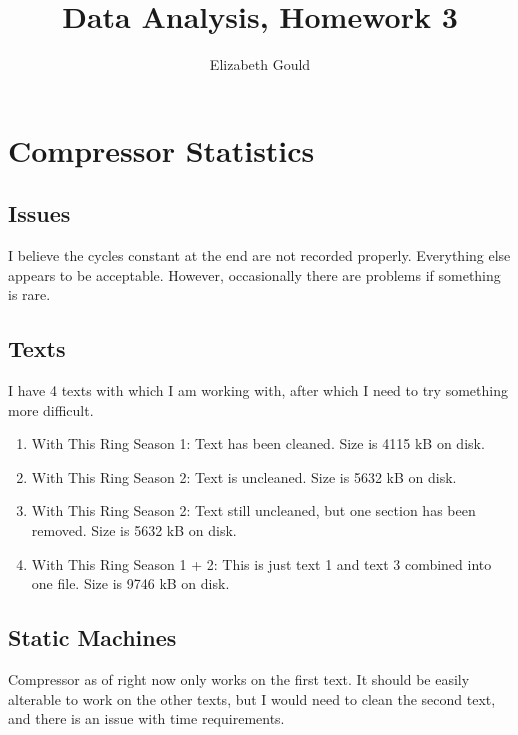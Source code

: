 \documentclass{article}
\title{Data Analysis, Homework 3}
\author{Elizabeth Gould}
\begin{document}
\maketitle

\section{Compressor Statistics}

\subsection{Issues}

I believe the cycles constant at the end are not recorded properly. Everything else appears to be acceptable. However, occasionally there are problems if something is rare.

\subsection{Texts}

I have 4 texts with which I am working with, after which I need to try something more difficult. 

\begin{enumerate}
\item With This Ring Season 1: Text has been cleaned. Size is 4115 kB on disk. 
\item With This Ring Season 2: Text is uncleaned. Size is 5632 kB on disk.
\item With This Ring Season 2: Text still uncleaned, but one section has been removed. Size is 5632 kB on disk.
\item With This Ring Season 1 + 2: This is just text 1 and text 3 combined into one file. Size is 9746 kB on disk.

\end{enumerate}

\subsection{Static Machines}

Compressor as of right now only works on the first text. It should be easily alterable to work on the other texts, but I would need to clean the second text, and there is an issue with time requirements.
\end{document}
